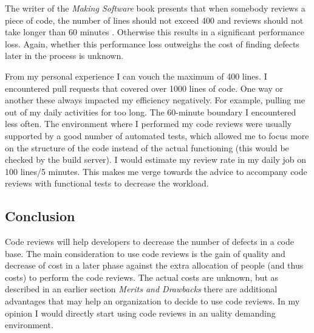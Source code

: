 The writer of the \textit{Making Software} book presents that when somebody reviews a piece of code,
the number of lines should not exceed 400 and reviews should not take longer than 60 minutes \autocite[330-332]{MAKING_SOFTWARE} \autocite[81]{cohen2006best} \autocite[470--471]{Dunsmore:2000:OIF:337180.337343}.
Otherwise this results in a significant performance loss.
Again, whether this performance loss outweighs the cost of finding defects later in the process is unknown.

From my personal experience I can vouch the maximum of 400 lines.
I encountered pull requests that covered over 1000 lines of code.
One way or another these always impacted my efficiency negatively.
For example, pulling me out of my daily activities for too long.
The 60-minute boundary I encountered less often.
The environment where I performed my code reviews were usually supported by a good number of automated tests,
which allowed me to focus more on the structure of the code instead of the actual functioning (this would be checked by the build server).
I would estimate my review rate in my daily job on 100 lines/5 minutes.
This makes me verge towards the advice to accompany code reviews with functional tests to decrease the workload.

\subsection*{Conclusion}

Code reviews will help developers to decrease the number of defects in a code base.
The main consideration to use code reviews is the gain of quality and decrease of cost in a later phase against the extra allocation of people (and thus costs) to perform the code reviews.
The actual costs are unknown, but as described in an earlier section \textit{Merits and Drawbacks} there are additional advantages that may help an organization to decide to use code reviews.
In my opinion I would directly start using code reviews in an uality demanding environment.